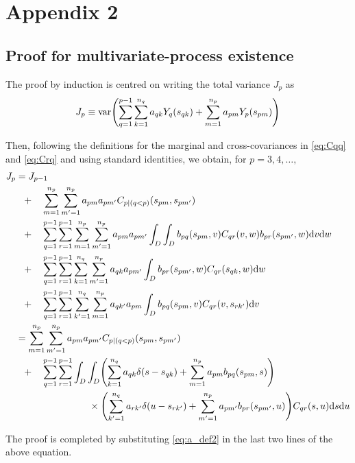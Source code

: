 \documentclass[lineno]{biometrika}
\newcommand{\intd} {\textrm{d}}
\newcommand{\svec} {s}
\newcommand{\uvec} {u}
\renewcommand{\v}{v}
\newcommand{\w}{w}
\newcommand{\var}{\mathrm{var}}
\let\originalleft\left
\let\originalright\right
\renewcommand{\left}{\mathopen{}\mathclose\bgroup\originalleft}
\renewcommand{\right}{\aftergroup\egroup\originalright}
\begin{document}
\appendixtwo
\section*{Appendix 2}
\subsection*{Proof for multivariate-process existence}

The proof by induction is centred on writing the total variance $J_p$ as
\begin{equation*}
J_p \equiv \var\left(\sum_{q=1}^{p-1} \sum_{k=1}^{n_q} a_{qk}Y_q(\svec_{qk}) + \sum_{m=1}^{n_p}a_{pm}Y_p(\svec_{pm})\right) 
\end{equation*}

Then, following the definitions for the marginal and cross-covariances in \eqref{eq:Cqq} and \eqref{eq:Crq} and using standard identities, we obtain, for $p = 3,4,\dots,$
\begin{align*}
J_p  &= J_{p-1}  \\
  &~~+\quad  \sum_{m=1}^{n_p}\sum_{m'=1}^{n_p}a_{pm}a_{pm'}C_{p \mid  (q < p)}(\svec_{pm},\svec_{pm'})  \\
  &~~+\quad \sum_{q=1}^{p-1}\sum_{r=1}^{p-1}\sum_{m=1}^{n_p}\sum_{m'=1}^{n_p} a_{pm}a_{pm'}\int_D\int_Db_{pq}(\svec_{pm},\v) C_{qr}(\v,\w)b_{pr}(\svec_{pm'},\w)\intd\v\intd\w  \\
  &~~+\quad \sum_{q=1}^{p-1}\sum_{r=1}^{p-1}\sum_{k=1}^{n_q}\sum_{m'=1}^{n_p} a_{qk}a_{pm'}\int_D b_{pr}(\svec_{pm'},\w)C_{qr}(\svec_{qk},\w)\intd \w  \\
  &~~+\quad \sum_{q=1}^{p-1}\sum_{r=1}^{p-1}\sum_{k'=1}^{n_q}\sum_{m=1}^{n_p} a_{qk'}a_{pm}\int_D b_{pq}(\svec_{pm},\v)C_{qr}(\v,\svec_{rk'})\intd \v  \\
  &= \sum_{m=1}^{n_p}\sum_{m'=1}^{n_p}a_{pm}a_{pm'}C_{p \mid  (q < p)}(\svec_{pm},\svec_{pm'})  \\  
  &~~+\quad \sum_{q=1}^{p-1}\sum_{r=1}^{p-1}\int_D\int_D \left(\sum_{k=1}^{n_q}a_{qk}\delta(\svec - \svec_{qk}) + \sum_{m=1}^{n_p}a_{pm}b_{pq}(\svec_{pm},\svec)\right) \\
  &~~\quad~~~~~~~~~~~~~~~~~~\times \left(\sum_{k'=1}^{n_q}a_{rk'}\delta(\uvec - \svec_{rk'}) + \sum_{m'=1}^{n_p}a_{pm'}b_{pr}(\svec_{pm'},\uvec)\right)C_{qr}(\svec,\uvec)\intd \svec \intd \uvec
\end{align*}

The proof is completed by substituting \eqref{eq:a_def2} in the last two lines of the above equation.
\end{document}

